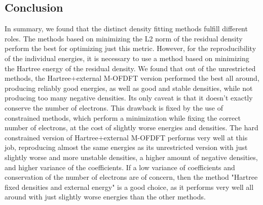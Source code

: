 \subsection{Conclusion}
In summary, we found that the distinct density fitting methods fulfill different roles. The methods based on minimizing the L2 norm of the residual density perform the best for optimizing just this metric. However, for the reproducibility of the individual energies, it is necessary to use a method based on minimizing the Hartree energy of the residual density. We found that out of the unrestricted methods, the Hartree+external M-OFDFT version performed the best all around, producing reliably good energies, as well as good and stable densities, while not producing too many negative densities. Its only caveat is that it doesn't exactly conserve the number of electrons. This drawback is fixed by the use of constrained methods, which perform a minimization while fixing the correct number of electrons, at the cost of slightly worse energies and densities. The hard constrained version of Hartree+external M-OFDFT performs very well at this job, reproducing almost the same energies as its unrestricted version with just slightly worse and more unstable densities, a higher amount of negative densities, and higher variance of the coefficients. If a low variance of coefficients and conservation of the number of electrons are of concern, then the method "Hartree fixed densities and external energy" is a good choice, as it performs very well all around with just slightly worse energies than the other methods.







